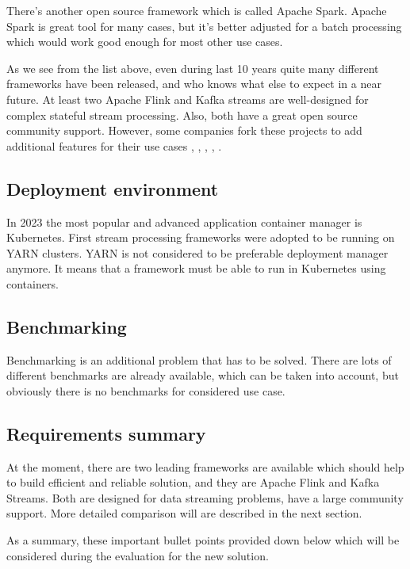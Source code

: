 There's another open source framework which is called Apache Spark.
Apache Spark is great tool for many cases, but it's better adjusted
for a batch processing which would work good enough for most other use cases.

As we see from the list above, even during last 10 years quite many different frameworks have
been released, and who knows what else to expect in a near future.
At least two Apache Flink and Kafka streams are well-designed for
complex stateful stream processing.
Also, both have a great open source community support.
However, some companies fork these projects to add additional features for their use cases
\cite{stream_processing_frameworks_overview}, \cite{flink2019}, \cite{kafka2020},
\cite{kleppmann2017}, \cite{kleppmann2016making}.

\subsection{Deployment environment}\label{subsec:deployment-environment}
In 2023 the most popular and advanced application container manager is Kubernetes.
First stream processing frameworks were adopted to be running on YARN clusters.
YARN is not considered to be preferable deployment manager anymore.
It means that a framework must be able to run in Kubernetes using containers.


\subsection{Benchmarking}\label{subsec:bench}
Benchmarking is an additional problem that has to be solved.
There are lots of different benchmarks are already available, which can
be taken into account, but obviously there is no benchmarks for considered use case.

\subsection{Requirements summary}\label{subsec:final-requirements}
At the moment, there are two leading frameworks are available which
should help to build efficient and reliable solution, and
they are Apache Flink and Kafka Streams.
Both are designed for data streaming problems, have a large community support.
More detailed comparison will are described in the next section.

As a summary, these important bullet points provided down below which will
be considered during the evaluation for the new solution.

